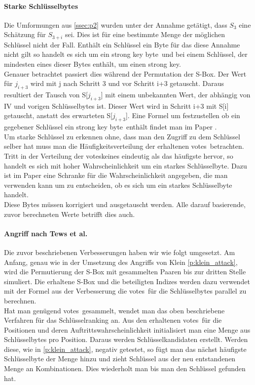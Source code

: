 \documentclass[10pt,a4paper]{article}
\begin{document}
\paragraph{Starke Schlüsselbytes}
Die Umformungen aus \ref{ssec:p2} wurden unter der Annahme getätigt, dass $S_3$ eine Schätzung für $S_{3+i}$ sei. Dies ist für eine bestimmte Menge der möglichen Schlüssel nicht der Fall. Enthält ein Schlüssel ein Byte für das diese Annahme nicht gilt so handelt es sich um ein \glqq strong key byte\grqq\ und bei einem Schlüssel, der mindesten eines dieser Bytes enthält, um einen \glqq strong key\grqq .\\
Genauer betrachtet passiert dies während der Permutation der S-Box. Der Wert für $j_{i+3}$ wird mit j nach Schritt 3 und vor Schritt i+3 getauscht. Daraus resultiert der Tausch von S[$j_{i+3}$] mit einem unbekannten Wert, der abhängig von IV und vorigen Schlüsselbytes ist. Dieser Wert wird in Schritt i+3 mit S[i] getauscht, anstatt des erwarteten S[$j_{i+3}$]. Eine Formel um festzustellen ob ein gegebener Schlüssel ein \glqq strong key byte\grqq\ enthält findet man im Paper \cite[Kapitel 4, Kapitel 6.2, Formel (9)]{TWP07}.\\
Um starke Schlüssel zu erkennen ohne, dass man den Zugriff zu dem Schlüssel selber hat muss man die Häufigkeitsverteilung der erhaltenen \glqq votes\grqq\ betrachten. Tritt in der Verteilung der \glqq votes\grqq keines eindeutig als das häufigste hervor, so handelt es sich mit hoher Wahrscheinlichkeit um ein starkes Schlüsselbyte. Dazu ist im Paper eine Schranke für die Wahrscheinlichkeit angegeben, die man verwenden kann um zu entscheiden, ob es sich um ein starkes Schlüsselbyte handelt.\cite[Kapitel 4, Kapitel 6.2, 1.]{TWP07}\\
Diese Bytes müssen korrigiert und ausgetauscht werden. Alle darauf basierende, zuvor berechneten Werte betrifft dies auch.\cite[Kapitel 4, Kapitel 6.2, 2.]{TWP07}
\paragraph{Angriff nach Tews et al.}
Die zuvor beschriebenen Verbesserungen haben wir wie folgt umgesetzt. Am Anfang, genau wie in der Umsetzung des Angriffs von Klein \ref{p:klein_attack}, wird die Permutierung der S-Box mit gesammelten Paaren bis zur dritten Stelle simuliert. Die erhaltene S-Box und die beteiligten Indizes werden dazu verwendet mit der Formel aus der Verbesserung die \glqq votes\grqq\ für die Schlüsselbytes parallel zu berechnen.\\
Hat man genügend \glqq votes\grqq\ gesammelt, wendet man das oben beschriebene Verfahren für das Schlüsselranking an. Aus den erhaltenen \glqq votes\grqq\ für die Positionen und deren Auftrittswahrscheinlichkeit initialisiert man eine Menge aus Schlüsselbytes pro Position. Daraus werden Schlüsselkandidaten erstellt. Werden diese, wie in \ref{p:klein_attack}, negativ getestet, so fügt man das nächst häufigste Schlüsselbyte der Menge hinzu und zieht Schlüssel aus der neu entstandenen Menge an Kombinationen. Dies wiederholt man bis man den Schlüssel gefunden hat.
\end{document}

